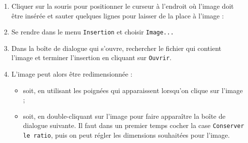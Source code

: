 \begin{enumerate}
\item Cliquer sur la souris pour positionner le curseur à l'endroit où l'image doit être insérée et sauter quelques lignes pour laisser de la place à l'image :


\item Se rendre dans le menu \texttt{Insertion} et choisir \texttt{Image...}


\item Dans la boîte de dialogue qui s'ouvre, rechercher le fichier qui contient l'image et terminer l'insertion en cliquant sur \texttt{Ouvrir}.

\item L'image peut alors être redimensionnée :
        \begin{itemize}
        \item soit, en utilisant les poignées qui apparaissent lorsqu'on clique sur l'image ;
        \item soit, en double-cliquant sur l'image pour faire apparaître la boîte de dialogue suivante. Il faut dans un premier temps cocher la case \texttt{Conserver le ratio}, puis on peut régler les dimensions souhaitées pour l'image.
        \end{itemize}
\end{enumerate}


